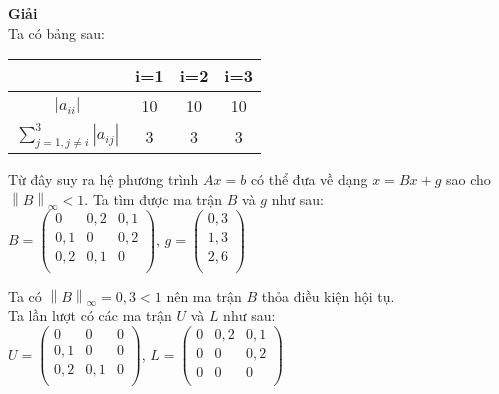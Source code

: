 \textbf{Giải}\\
Ta có bảng sau:
\begin{center} \begin{tabular}{|c|c|c|c|}\hline
&i=1&i=2&i=3\\\hline
$\left|a_{ii}\right|$&10&10&10\\\hline
$\sum\limits_{j=1,j\neq i}^{3} \left|a_{ij}\right|$&3&3&3\\\hline
\end{tabular}\end{center}

Từ đây suy ra hệ phương trình $Ax=b$ có thể đưa về dạng $x=Bx+g$ sao cho $\left\|B\right\|_{\infty} <1$.
Ta tìm được ma trận $B$ và $g$ như sau:\\
$B= \begin{pmatrix}
0&0,2&0,1\\
0,1&0&0,2\\
0,2&0,1&0\\
\end{pmatrix}$, $g=\begin{pmatrix}
0,3\\
1,3\\
2,6\\
\end{pmatrix}$

Ta có $\left\|B\right\|_{\infty}=0,3<1 $ nên ma trận $B$ thỏa điều kiện hội tụ.\\
Ta lần lượt có các ma trận $U$ và $L$ như sau:\\
$U=\begin{pmatrix}
0&0&0\\
0,1&0&0\\
0,2&0,1&0\\
\end{pmatrix}$, $L=\begin{pmatrix}
0&0,2&0,1\\
0&0&0,2\\
0&0&0\\
\end{pmatrix}$

